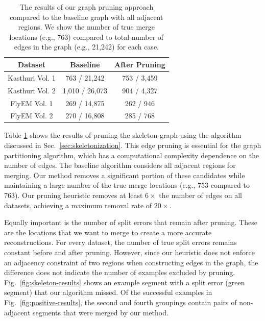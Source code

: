 \begin{table}
	\centering
	\small
	\begin{tabular}{c c c} \hline
		\textbf{Dataset} & \textbf{Baseline} & \textbf{After Pruning} \\ \hline
		Kasthuri Vol. 1 & 763 / 21,242 & 753 / 3,459 \\
		Kasthuri Vol. 2 & 1,010 / 26,073 & 904 / 4,327 \\
		FlyEM Vol. 1 & 269 / 14,875 & 262 / 946 \\
		FlyEM Vol. 2 & 270 / 16,808 & 285 / 768 \\ \hline
	\end{tabular}
	\caption{The results of our graph pruning approach compared to the baseline graph with all adjacent regions. We show the number of true merge locations (e.g., 763) compared to total number of edges in the graph (e.g., 21,242) for each case.}
	\label{table:skeletonization}
\end{table}

Table \ref{table:skeletonization} shows the results of pruning the skeleton graph using the algorithm discussed in Sec.~\ref{sec:skeletonization}. This edge pruning is essential for the graph partitioning algorithm, which has a computational complexity dependence on the number of edges. The baseline algorithm considers all adjacent regions for merging. Our method removes a significant portion of these candidates while maintaining a large number of the true merge locations (e.g., 753 compared to 763). Our pruning heuristic removes at least $6\times$ the number of edges on all datasets, achieving a maximum removal rate of $20\times$.

Equally important is the number of split errors that remain after pruning. These are the locations that we want to merge to create a more accurate reconstructions. For every dataset, the number of true split errors remains constant before and after pruning. 
However, since our heuristic does not enforce an adjacency constraint of two regions when constructing edges in the graph, the difference does not indicate the number of examples excluded by pruning. Fig.~\ref{fig:skeleton-results} shows an example segment with a split error (green segment) that our algorithm missed. Of the successful examples in Fig.~\ref{fig:positive-results}, the second and fourth groupings contain pairs of non-adjacent segments that were merged by our method. 

